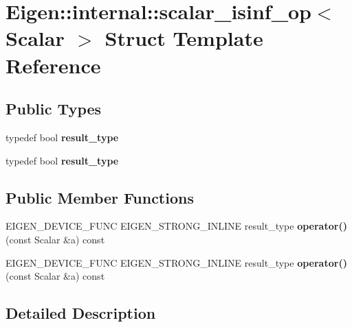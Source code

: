 \hypertarget{struct_eigen_1_1internal_1_1scalar__isinf__op}{}\section{Eigen\+:\+:internal\+:\+:scalar\+\_\+isinf\+\_\+op$<$ Scalar $>$ Struct Template Reference}
\label{struct_eigen_1_1internal_1_1scalar__isinf__op}
\subsection*{Public Types}
\begin{DoxyCompactItemize}
\item 
\mbox{\label{struct_eigen_1_1internal_1_1scalar__isinf__op_afe7b3b55a9667996d27738122ae6c2f7}} 
typedef bool {\bfseries result\+\_\+type}
\item 
\mbox{\label{struct_eigen_1_1internal_1_1scalar__isinf__op_afe7b3b55a9667996d27738122ae6c2f7}} 
typedef bool {\bfseries result\+\_\+type}
\end{DoxyCompactItemize}
\subsection*{Public Member Functions}
\begin{DoxyCompactItemize}
\item 
\mbox{\label{struct_eigen_1_1internal_1_1scalar__isinf__op_a78f82f9ed7153199e9daea1c6a78bb2e}} 
E\+I\+G\+E\+N\+\_\+\+D\+E\+V\+I\+C\+E\+\_\+\+F\+U\+NC E\+I\+G\+E\+N\+\_\+\+S\+T\+R\+O\+N\+G\+\_\+\+I\+N\+L\+I\+NE result\+\_\+type {\bfseries operator()} (const Scalar \&a) const
\item 
\mbox{\label{struct_eigen_1_1internal_1_1scalar__isinf__op_a78f82f9ed7153199e9daea1c6a78bb2e}} 
E\+I\+G\+E\+N\+\_\+\+D\+E\+V\+I\+C\+E\+\_\+\+F\+U\+NC E\+I\+G\+E\+N\+\_\+\+S\+T\+R\+O\+N\+G\+\_\+\+I\+N\+L\+I\+NE result\+\_\+type {\bfseries operator()} (const Scalar \&a) const
\end{DoxyCompactItemize}


\subsection{Detailed Description}
